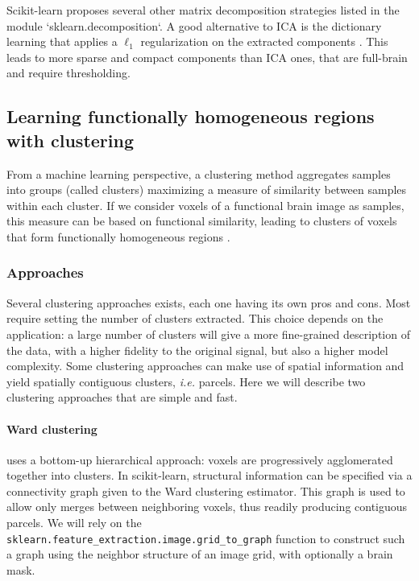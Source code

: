 \documentclass{frontiersSCNS} %
\begin{document}
Scikit-learn proposes several other matrix decomposition strategies listed in
the module `sklearn.decomposition`. A good alternative to ICA is the dictionary
learning that applies a $\ell_1$ regularization on the extracted components
\citep{varoquaux2011}.
This leads to more sparse and compact components than ICA ones, that are
full-brain and require thresholding. 


\subsection{Learning functionally homogeneous regions with clustering}
\label{clustering}

From a machine learning perspective, a clustering method aggregates 
samples into groups (called clusters) maximizing a measure of similarity
between samples within each cluster. If we consider voxels of a functional brain image
as samples, this 
measure can be based on functional similarity, leading to clusters of voxels
that form functionally homogeneous regions \citep{thirion2006}.

\subsubsection{Approaches}

Several clustering approaches exists, each one having its own pros and
cons. Most require setting the number of clusters extracted. This choice
depends on the application: a large number of clusters will give a more
fine-grained description of the data, with a higher fidelity to the
original signal, but also a higher model complexity. Some clustering
approaches can make use of spatial information and yield
spatially contiguous clusters, \emph{i.e.} parcels. Here we will describe
two clustering approaches that are simple and fast.

\paragraph{Ward clustering} uses a bottom-up hierarchical approach:
voxels are progressively agglomerated together into clusters. In
scikit-learn, structural information can be specified via a connectivity
graph given to the Ward clustering estimator. This graph is used to allow
only merges between neighboring voxels, thus readily producing contiguous
parcels. We will rely on the {\tt
sklearn.feature\_extraction.image.grid\_to\_graph} function to
construct such a graph using the neighbor structure of an image grid,
with optionally a brain mask.
\end{document}
